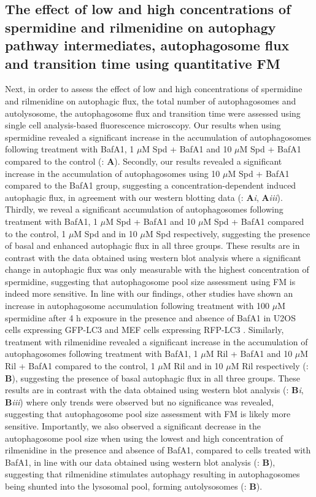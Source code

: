 \subsection{The effect of low and high concentrations of spermidine and rilmenidine on autophagy pathway intermediates, autophagosome flux and transition time using quantitative FM}
Next, in order to assess the effect of low and high concentrations of spermidine and rilmenidine on autophagic flux, the total number of autophagosomes and autolysosome, the autophagosome flux and transition time \citep{loos2014} were assessed using single cell analysis-based fluorescence microscopy. Our results when using spermidine revealed a significant increase in the accumulation of autophagosomes following treatment with BafA1, 1 $\mu$M Spd + BafA1 and 10 $\mu$M Spd + BafA1 compared to the control (: \textbf{A}). Secondly, our results revealed a significant increase in the accumulation of autophagosomes using 10 $\mu$M Spd + BafA1 compared to the BafA1 group, suggesting a concentration-dependent induced autophagic flux, in agreement with our western blotting data (: \textbf{A}\textit{i}, \textbf{A}\textit{iii}).  Thirdly, we reveal a significant accumulation of autophagosomes following treatment with BafA1, 1 $\mu$M Spd + BafA1 and 10 $\mu$M Spd + BafA1 compared to the control, 1 $\mu$M Spd and in 10 $\mu$M Spd respectively, suggesting the presence of basal and enhanced autophagic flux in all three groups. These results are in contrast with the data obtained using western blot analysis where a significant change in autophagic flux was only measurable with the highest concentration of spermidine, suggesting that autophagosome pool size assessment using FM is indeed more sensitive. In line with our findings, other studies have shown an increase in autophagosome accumulation following treatment with 100 $\mu$M spermidine after 4 h exposure in the presence and absence of BafA1 in U2OS cells expressing GFP-LC3  \citep{Pietrocola2015} and MEF cells expressing RFP-LC3 \citep{Yue2017}. Similarly, treatment with rilmenidine revealed a significant increase in the accumulation of autophagosomes following treatment with BafA1, 1 $\mu$M Ril + BafA1 and 10 $\mu$M Ril + BafA1 compared to the control, 1 $\mu$M Ril and in 10 $\mu$M Ril respectively (: \textbf{B}), suggesting the presence of basal autophagic flux in all three groups. These results are in contrast with the data obtained using western blot analysis (: \textbf{B}\textit{i}, \textbf{B}\textit{iii}) where only trends were observed but no significance was revealed, suggesting that autophagosome pool size assessment with FM is likely more sensitive.  Importantly, we also observed a significant decrease in the autophagosome pool size when using the lowest and high concentration of rilmenidine in the presence and absence of BafA1, compared to cells treated with BafA1, in line with our data obtained using western blot analysis (: \textbf{B}), suggesting that rilmenidine stimulates autophagy resulting in autophagosomes being shunted into the lysosomal pool, forming autolysosomes (: \textbf{B}). 

